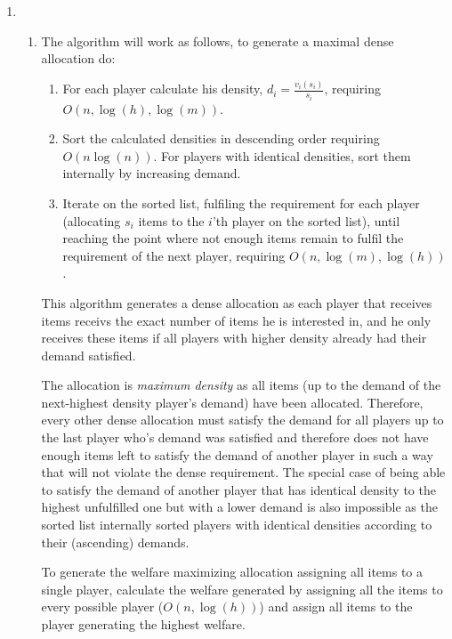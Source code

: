 \documentclass[a4page,notitlepage]{article}
\begin{document}
\begin{enumerate}
\item
  \begin{enumerate}
  \item The algorithm will work as follows, to generate a maximal
    dense allocation do:
    \begin{enumerate}
    \item For each player calculate his density, $d_i=\frac{v_i(s_i)}{s_i}$, requiring $O(n,\log(h),\log(m))$.
    \item Sort the calculated densities in descending order requiring $O(n\log(n))$.
      For players with identical densities, sort them internally by increasing demand.
    \item Iterate on the sorted list, fulfiling the requirement for
      each player (allocating $s_i$ items to the $i$'th player on the sorted list), until reaching the point where not enough items
      remain to fulfil the requirement of the next player, requiring $O(n,\log(m),\log(h))$.
    \end{enumerate}
    This algorithm generates a dense allocation as each player that receives items receivs the exact number of items he is interested in, and he only receives these items if all players with higher density already had their demand satisfied.

    The allocation is \textit{maximum density} as all items (up to the demand of the next-highest density player's demand) have been allocated.
Therefore, every other dense allocation must satisfy the demand for all players up to the last player who's demand was satisfied and therefore does not have enough items left to satisfy the demand of another player in such a way that will not violate the dense requirement.
The special case of being able to satisfy the demand of another player that has identical density to the highest unfulfilled one but with a lower demand is also impossible as the sorted list internally sorted players with identical densities according to their (ascending) demands.

    To generate the welfare maximizing allocation assigning all items to a single player, calculate the welfare generated by assigning all the items to every possible player ($O(n,\log(h))$) and assign all items to the player generating the highest welfare.
    

\end{enumerate}
\end{enumerate}
\end{document}
